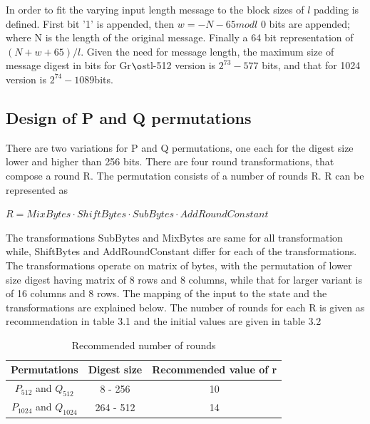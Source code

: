   In order to fit the varying input length message to the block sizes of $ l $ padding is defined. First bit '1' is
  appended, then $ w = -N - 65 mod l $ 0 bits are appended; where N is the length of the original message. Finally a
  64 bit representation of $(N + w + 65) / l $. Given the need for message length, the maximum size of message digest
  in bits for Gr$\o$stl-512 version is $2^{73}-577$ bits, and that for 1024 version is $2^{74}-1089$bits.

  \subsection{Design of P and Q permutations}

  There are two variations for P and Q permutations, one each for the digest size lower and higher than 256 bits. There
  are four round transformations, that compose a round R. The permutation consists of a number of rounds R. R can be
  represented as 

  $ R = MixBytes \cdot ShiftBytes \cdot SubBytes \cdot AddRoundConstant $

  The transformations SubBytes and MixBytes are same for all transformation while, ShiftBytes and AddRoundConstant differ
  for each of the transformations. The transformations operate on matrix of bytes, with the permutation of lower size
  digest having matrix of 8 rows and 8 columns, while that for larger variant is of 16 columns and 8 rows. The mapping of
  the input to the state and the transformations are explained below. The number of rounds for each R is given as 
  recommendation in table 3.1 and the initial values are given in table 3.2
  
  \begin{table}
    \begin{center}
      \begin{tabular}{ *{3}{c} } \hline
        Permutations            & Digest size & Recommended value of r \\ \hline
        $P_{512}$ and $Q_{512}$   & 8 - 256     & 10 \\
        $P_{1024}$ and $Q_{1024}$ & 264 - 512   & 14 \\ \hline 
      \end{tabular}
      \caption{Recommended number of rounds}
    \end{center}
  \end{table}

